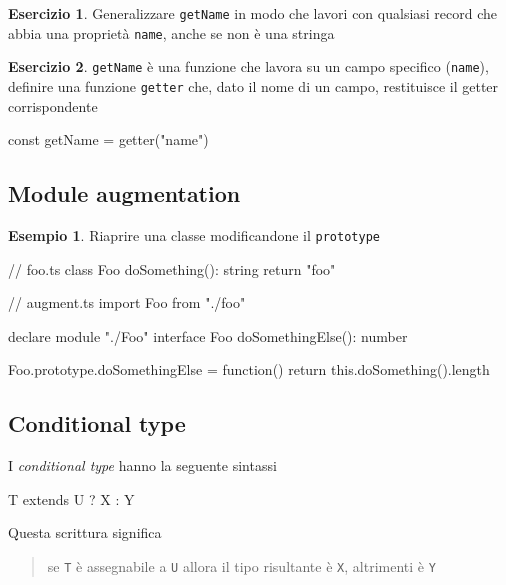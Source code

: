 \documentclass[12pt]{article}
\theoremstyle{definition}
\newtheorem{example}{Esempio}[subsection]
\newtheorem{exercise}{Esercizio}[subsection]
\newenvironment{code}
  {\vspace{0.5cm} \VerbatimEnvironment\begin{typescriptcode}}
  {\end{typescriptcode} \vspace{0.2cm}}
\begin{document}
\begin{exercise}
Generalizzare \texttt{getName} in modo che lavori con qualsiasi record che abbia una proprietà \texttt{name}, anche se non è una stringa
\end{exercise}

\begin{exercise}
\texttt{getName} è una funzione che lavora su un campo specifico (\texttt{name}), definire
una funzione \texttt{getter} che, dato il nome di un campo, restituisce il getter corrispondente

\begin{code}
const getName = getter("name")
\end{code}
\end{exercise}

\subsection{Module augmentation}

\begin{example}
Riaprire una classe modificandone il \texttt{prototype}

\begin{code}
// foo.ts
class Foo {
  doSomething(): string {
    return "foo"
  }
}

// augment.ts
import { Foo } from "./foo"

declare module "./Foo" {
  interface Foo {
    doSomethingElse(): number
  }
}

Foo.prototype.doSomethingElse = function() {
  return this.doSomething().length
}
\end{code}
\end{example}

\subsection{Conditional type}

I \emph{conditional type} hanno la seguente sintassi

\begin{code}
T extends U ? X : Y
\end{code}

Questa scrittura significa

\begin{quote}
se \texttt{T} è assegnabile a \texttt{U} allora il tipo risultante è \texttt{X}, altrimenti è \texttt{Y}
\end{quote}
\end{document}
